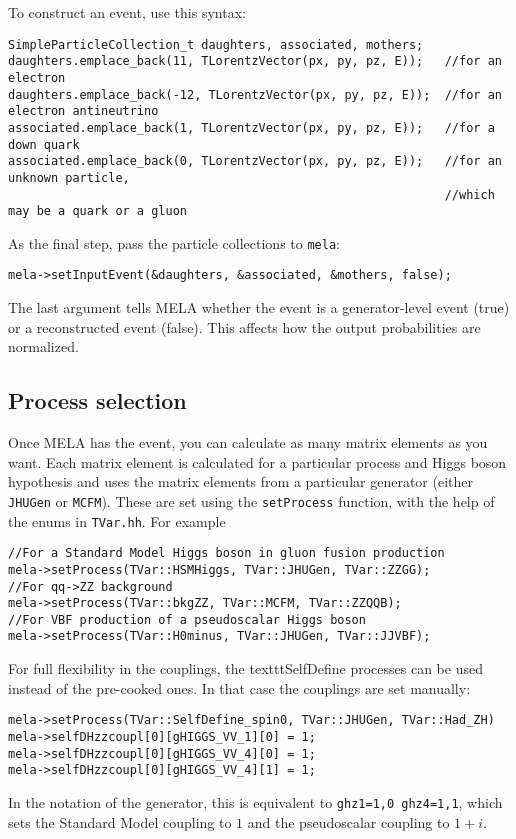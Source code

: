 \documentclass[aps,superscriptaddress,nofootinbib]{revtex4}
\begin{document}
To construct an event, use this syntax:
\begin{verbatim}
SimpleParticleCollection_t daughters, associated, mothers;
daughters.emplace_back(11, TLorentzVector(px, py, pz, E));   //for an electron
daughters.emplace_back(-12, TLorentzVector(px, py, pz, E));  //for an electron antineutrino
associated.emplace_back(1, TLorentzVector(px, py, pz, E));   //for a down quark
associated.emplace_back(0, TLorentzVector(px, py, pz, E));   //for an unknown particle,
                                                             //which may be a quark or a gluon
\end{verbatim}

As the final step, pass the particle collections to \texttt{mela}:
\begin{verbatim}
mela->setInputEvent(&daughters, &associated, &mothers, false);
\end{verbatim}
The last argument tells MELA whether the event is a generator-level event (true) or a reconstructed event (false).  This affects how the output probabilities are normalized.

\subsection{Process selection}
Once MELA has the event, you can calculate as many matrix elements as you want.  Each matrix element is calculated for a particular process and Higgs boson hypothesis and uses the matrix elements from a particular generator (either \texttt{JHUGen} or \texttt{MCFM}).  These are set using the \texttt{setProcess} function, with the help of the enums in \texttt{TVar.hh}.  For example
\begin{verbatim}
//For a Standard Model Higgs boson in gluon fusion production
mela->setProcess(TVar::HSMHiggs, TVar::JHUGen, TVar::ZZGG);
//For qq->ZZ background
mela->setProcess(TVar::bkgZZ, TVar::MCFM, TVar::ZZQQB);
//For VBF production of a pseudoscalar Higgs boson
mela->setProcess(TVar::H0minus, TVar::JHUGen, TVar::JJVBF);
\end{verbatim}

For full flexibility in the couplings, the texttt{SelfDefine} processes can be used instead of the pre-cooked ones.  In that case the couplings are set manually:
\begin{verbatim}
mela->setProcess(TVar::SelfDefine_spin0, TVar::JHUGen, TVar::Had_ZH)
mela->selfDHzzcoupl[0][gHIGGS_VV_1][0] = 1;
mela->selfDHzzcoupl[0][gHIGGS_VV_4][0] = 1;
mela->selfDHzzcoupl[0][gHIGGS_VV_4][1] = 1;
\end{verbatim}
In the notation of the generator, this is equivalent to \texttt{ghz1=1,0 ghz4=1,1}, which sets the Standard Model coupling to $1$ and the pseudoscalar coupling to $1+i$.
\end{document}
